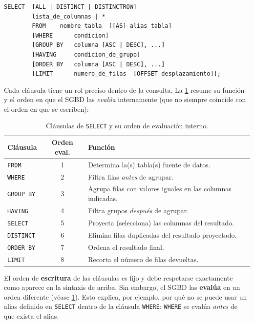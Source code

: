 \documentclass[12pt, a4paper]{article}
\begin{document}
	\begin{lstlisting}[caption={Sintaxis completa de SELECT.}]
		SELECT  [ALL | DISTINCT | DISTINCTROW]
		lista_de_columnas | *
		FROM    nombre_tabla  [[AS] alias_tabla]
		[WHERE      condicion]
		[GROUP BY   columna [ASC | DESC], ...]
		[HAVING     condicion_de_grupo]
		[ORDER BY   columna [ASC | DESC], ...]
		[LIMIT      numero_de_filas  [OFFSET desplazamiento]];
	\end{lstlisting}
	
	Cada cláusula tiene un rol preciso dentro de la consulta.
	La \cref{tab:clausulas-select} resume su función y el orden en que
	el SGBD las \textit{evalúa} internamente (que no siempre coincide
	con el orden en que se escriben):
	
	\begin{table}[H]
		\centering
		\small
		\renewcommand{\arraystretch}{1.4}
		\begin{tabularx}{\linewidth}{@{} l c X @{}}
			\toprule
			\textbf{Cláusula} & \textbf{Orden eval.} & \textbf{Función} \\
			\midrule
			\texttt{FROM}     & 1 & Determina la(s) tabla(s) fuente de datos. \\
			\texttt{WHERE}    & 2 & Filtra filas \textit{antes} de agrupar. \\
			\texttt{GROUP BY} & 3 & Agrupa filas con valores iguales en las columnas indicadas. \\
			\texttt{HAVING}   & 4 & Filtra grupos \textit{después} de agrupar. \\
			\texttt{SELECT}   & 5 & Proyecta (selecciona) las columnas del resultado. \\
			\texttt{DISTINCT} & 6 & Elimina filas duplicadas del resultado proyectado. \\
			\texttt{ORDER BY} & 7 & Ordena el resultado final. \\
			\texttt{LIMIT}    & 8 & Recorta el número de filas devueltas. \\
			\bottomrule
		\end{tabularx}
		\caption{Cláusulas de \texttt{SELECT} y su orden de evaluación interno.}
		\label{tab:clausulas-select}
	\end{table}
	
	\begin{nota}
		El orden de \textbf{escritura} de las cláusulas es fijo y debe
		respetarse exactamente como aparece en la sintaxis de arriba.
		Sin embargo, el SGBD las \textbf{evalúa} en un orden diferente
		(véase \cref{tab:clausulas-select}).
		Esto explica, por ejemplo, por qué no se puede usar un alias
		definido en \texttt{SELECT} dentro de la cláusula \texttt{WHERE}:
		\texttt{WHERE} se evalúa \textit{antes} de que exista el alias.
	\end{nota}
	
\end{document}
